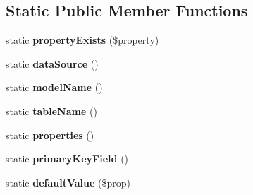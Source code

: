\subsection*{Static Public Member Functions}
\begin{DoxyCompactItemize}
\item 
\hypertarget{classModel_a8e853a3dd47485ede05e98c476c197c7}{
static {\bfseries propertyExists} (\$property)}
\label{classModel_a8e853a3dd47485ede05e98c476c197c7}

\item 
\hypertarget{classModel_a78c35654d16c5e224a469cb0ea561f17}{
static {\bfseries dataSource} ()}
\label{classModel_a78c35654d16c5e224a469cb0ea561f17}

\item 
\hypertarget{classModel_ac10ba432aee5f57e0aa486c957239b06}{
static {\bfseries modelName} ()}
\label{classModel_ac10ba432aee5f57e0aa486c957239b06}

\item 
\hypertarget{classModel_ac573f684b7d5c80e3242e74aff99a897}{
static {\bfseries tableName} ()}
\label{classModel_ac573f684b7d5c80e3242e74aff99a897}

\item 
\hypertarget{classModel_a54daacbb560bb2c415b0879487793244}{
static {\bfseries properties} ()}
\label{classModel_a54daacbb560bb2c415b0879487793244}

\item 
\hypertarget{classModel_aeb0b2da7c4ae1465de34422f681e357b}{
static {\bfseries primaryKeyField} ()}
\label{classModel_aeb0b2da7c4ae1465de34422f681e357b}

\item 
\hypertarget{classModel_ab284feac61b61b955221adb5f76e8bee}{
static {\bfseries defaultValue} (\$prop)}
\label{classModel_ab284feac61b61b955221adb5f76e8bee}

\end{DoxyCompactItemize}
